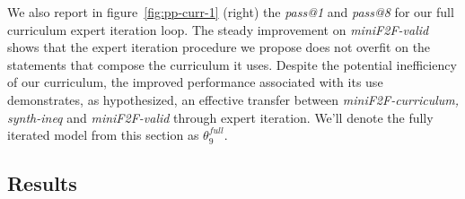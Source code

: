 \documentclass[nohyperref]{article}
\theoremstyle{plain}
\theoremstyle{definition}
\theoremstyle{remark}
\begin{document}
We also report in figure~\ref{fig:pp-curr-1} (right) the \textit{pass@1} and \textit{pass@8} for our full curriculum expert iteration loop. The steady improvement on \textit{miniF2F-valid} shows that the expert iteration procedure we propose does not overfit on the statements that compose the curriculum it uses. Despite the potential inefficiency of our curriculum, the improved performance associated with its use demonstrates, as hypothesized, an effective transfer between \textit{miniF2F-curriculum, synth-ineq} and \textit{miniF2F-valid} through expert iteration. We'll denote the fully iterated model from this section as $\theta_9^{\textit{full}}$.

\subsection{Results}
\end{document}
